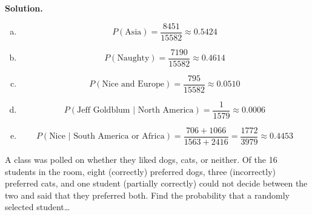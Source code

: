 \documentclass[12pt,letterpaper]{exam}
\begin{document}
\begin{questions}
 \pspace

{\noindent\bfseries Solution.}

\begin{enumerate}[(a)]
\item 
	\[
	P(\text{Asia})= \dfrac{8451}{15582} \approx 0.5424
	\] \vfill

\item 
	\[
	P(\text{Naughty})= \dfrac{7190}{15582} \approx 0.4614
	\] \vfill

\item 
	\[
	P(\text{Nice and Europe})= \dfrac{795}{15582} \approx 0.0510
	\] \vfill

\item 
	\[
	P(\text{Jeff Goldblum | North America})= \dfrac{1}{1579} \approx 0.0006
	\] \vfill

\item 
	\[
	P(\text{Nice | South America or Africa})= \dfrac{706 + 1066}{1563 + 2416}= \dfrac{1772}{3979} \approx 0.4453
	\] \vfill
\end{enumerate}





\newpage
\question A class was polled on whether they liked dogs, cats, or neither. Of the 16 students in the room, eight (correctly) preferred dogs, three (incorrectly) preferred cats, and one student (partially correctly) could not decide between the two and said that they preferred both. Find the probability that a randomly selected student\dots
        \begin{parts}

\end{parts}
\end{questions}
\end{document}
